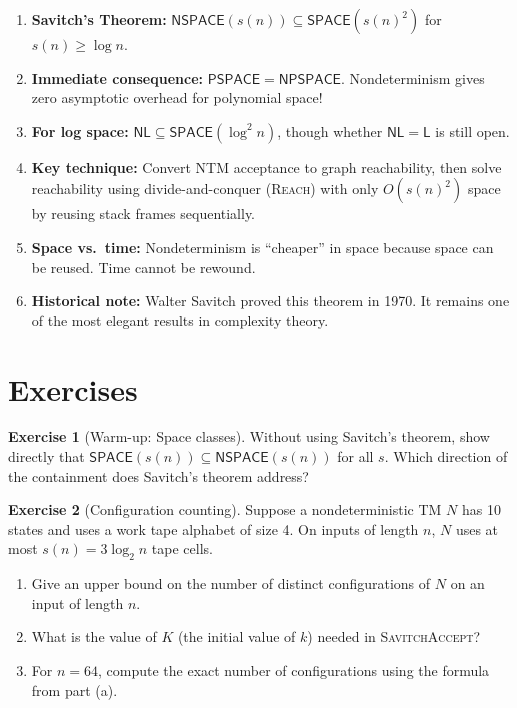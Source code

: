 \documentclass[12pt,a4paper]{article}
\theoremstyle{plain}
\theoremstyle{definition}
\newtheorem{exercise}{Exercise}[section]
\theoremstyle{remark}
\newcommand{\SPACE}{\mathsf{SPACE}}
\newcommand{\NSPACE}{\mathsf{NSPACE}}
\newcommand{\PSPACE}{\mathsf{PSPACE}}
\newcommand{\NPSPACE}{\mathsf{NPSPACE}}
\newcommand{\NL}{\mathsf{NL}}
\newcommand{\LL}{\mathsf{L}}
\begin{document}
\begin{tcolorbox}[colback=lightblue, colframe=darkblue, colbacktitle=darkblue,
                  fonttitle=\bfseries\color{white}, title={Chapter Summary},
                  arc=4pt, boxrule=1.2pt, breakable]
\begin{enumerate}
  \item \textbf{Savitch's Theorem:} $\NSPACE(s(n)) \subseteq \SPACE(s(n)^2)$ for $s(n) \geq \log n$.
  \item \textbf{Immediate consequence:} $\PSPACE = \NPSPACE$. Nondeterminism gives zero asymptotic overhead for polynomial space!
  \item \textbf{For log space:} $\NL \subseteq \SPACE(\log^2 n)$, though whether $\NL = \LL$ is still open.
  \item \textbf{Key technique:} Convert NTM acceptance to graph reachability, then solve reachability using divide-and-conquer (\textsc{Reach}) with only $O(s(n)^2)$ space by reusing stack frames sequentially.
  \item \textbf{Space vs.\ time:} Nondeterminism is ``cheaper'' in space because space can be reused. Time cannot be rewound.
  \item \textbf{Historical note:} Walter Savitch proved this theorem in 1970. It remains one of the most elegant results in complexity theory.
\end{enumerate}
\end{tcolorbox}

\section{Exercises}

\begin{exercise}[Warm-up: Space classes]\label{ex:warmup}
Without using Savitch's theorem, show directly that $\SPACE(s(n)) \subseteq \NSPACE(s(n))$ for all $s$. Which direction of the containment does Savitch's theorem address?
\end{exercise}

\begin{exercise}[Configuration counting]\label{ex:configs}
Suppose a nondeterministic TM $N$ has 10 states and uses a work tape alphabet of size 4. On inputs of length $n$, $N$ uses at most $s(n) = 3\log_2 n$ tape cells.
\begin{enumerate}[label=(\alph*)]
  \item Give an upper bound on the number of distinct configurations of $N$ on an input of length $n$.
  \item What is the value of $K$ (the initial value of $k$) needed in \textsc{SavitchAccept}?
  \item For $n = 64$, compute the exact number of configurations using the formula from part (a).
\end{enumerate}
\end{exercise}
\end{document}
